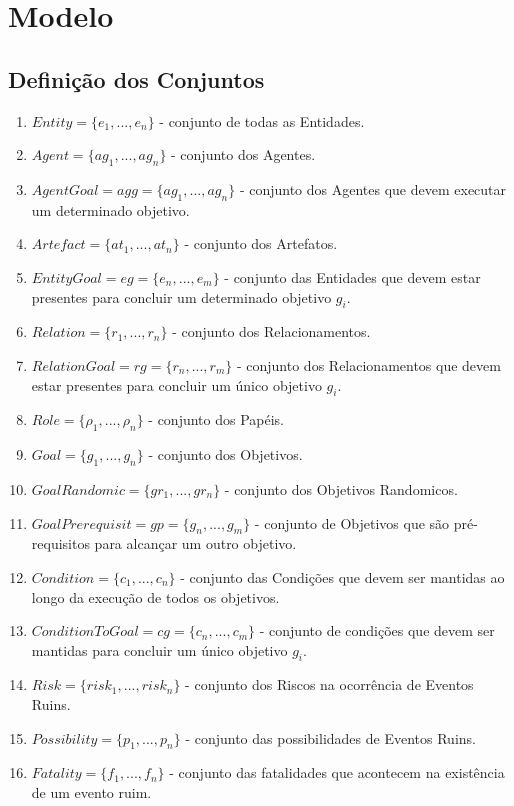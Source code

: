 \documentclass[12pt]{article}
\begin{document}
\section{Modelo}

\subsection{Definição dos Conjuntos}

\begin{enumerate}
	\item $Entity = \{e_1, ..., e_n\}$ - conjunto de todas as Entidades.  
	\item $Agent = \{ag_1, ..., ag_n\}$ - conjunto dos Agentes.
	\item $AgentGoal = agg = \{ag_1, ..., ag_n\}$ - conjunto dos Agentes que devem executar um determinado objetivo. 
	\item $Artefact = \{at_1, ..., at_n\}$ - conjunto dos Artefatos.
	\item $EntityGoal = eg = \{e_n,...,e_m\}$ - conjunto das Entidades que devem estar presentes para concluir um determinado objetivo $g_i$.
	\item $Relation = \{r_1, ..., r_n\}$ - conjunto dos Relacionamentos.	
	\item $RelationGoal = rg =\{r_n, ..., r_m\}$ - conjunto dos Relacionamentos que devem estar presentes para concluir um único objetivo $g_i$.		
	\item $Role = \{\rho_1, ..., \rho_n\}$ - conjunto dos Papéis.	
	\item $Goal = \{g_1, ..., g_n\}$ - conjunto dos Objetivos.
	\item $GoalRandomic = \{gr_1,..., gr_n\}$ - conjunto dos Objetivos	Randomicos.
	\item $GoalPrerequisit = gp = \{g_n,...,g_m\}$ - conjunto de Objetivos que são pré-requisitos para alcançar um outro objetivo.
	\item $Condition = \{c_1, ..., c_n\}$ - conjunto das Condições que devem ser mantidas ao longo da execução de todos os objetivos.
	\item $ConditionToGoal = cg = \{c_n, ..., c_m\}$ - conjunto de condições que devem ser mantidas para concluir um único objetivo $g_i$.
	\item $Risk = \{risk_1, ..., risk_n\}$ - conjunto dos Riscos na ocorrência de Eventos Ruins.
	\item $Possibility = \{p_1, ..., p_n\}$ - conjunto das possibilidades de Eventos Ruins. 
	\item $Fatality = \{f_1, ..., f_n\}$ - conjunto das fatalidades que acontecem na existência de um evento ruim. 	
\end{enumerate}
\end{document}
